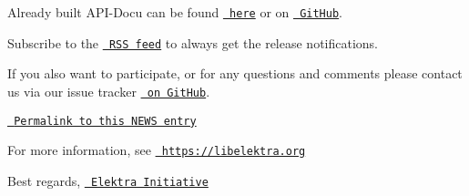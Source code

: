 Already built A\+P\+I-\/\+Docu can be found \href{https://doc.libelektra.org/api/0.9.<<VERSION>>/html/}{\texttt{ here}} or on \href{https://github.com/ElektraInitiative/doc/tree/master/api/0.9.<<VERSION>}{\texttt{ Git\+Hub}}.

Subscribe to the \href{https://www.libelektra.org/news/feed.rss}{\texttt{ R\+SS feed}} to always get the release notifications.

If you also want to participate, or for any questions and comments please contact us via our issue tracker \href{http://issues.libelektra.org}{\texttt{ on Git\+Hub}}.

\href{https://www.libelektra.org/news/0.9.<<VERSION>>-release}{\texttt{ Permalink to this N\+E\+WS entry}}

For more information, see \href{https://libelektra.org}{\texttt{ https\+://libelektra.\+org}}

Best regards, \href{https://www.libelektra.org/developers/authors}{\texttt{ Elektra Initiative}} 